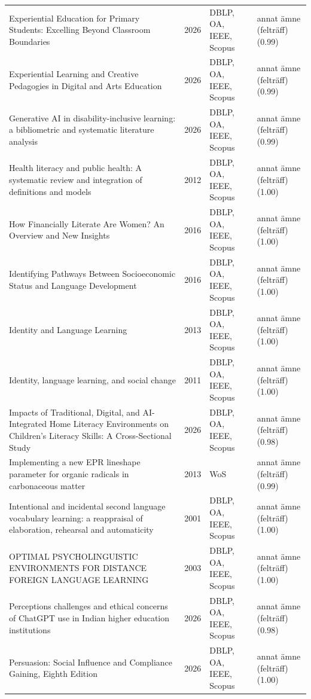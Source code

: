 \begin{longtable}{@{}%
  >{\raggedright\arraybackslash}p{}c%
  >{\raggedright\arraybackslash}p{}%
  >{\raggedright\arraybackslash}p{}@{}}
Experiential Education for Primary Students: Excelling Beyond Classroom Boundaries & 2026 & DBLP, OA, IEEE, Scopus & annat ämne (felträff) (0.99) \\
Experiential Learning and Creative Pedagogies in Digital and Arts Education & 2026 & DBLP, OA, IEEE, Scopus & annat ämne (felträff) (0.99) \\
Generative AI in disability-inclusive learning: a bibliometric and systematic literature analysis & 2026 & DBLP, OA, IEEE, Scopus & annat ämne (felträff) (0.99) \\
Health literacy and public health: A systematic review and integration of definitions and models & 2012 & DBLP, OA, IEEE, Scopus & annat ämne (felträff) (1.00) \\
How Financially Literate Are Women? An Overview and New Insights & 2016 & DBLP, OA, IEEE, Scopus & annat ämne (felträff) (1.00) \\
Identifying Pathways Between Socioeconomic Status and Language Development & 2016 & DBLP, OA, IEEE, Scopus & annat ämne (felträff) (1.00) \\
Identity and Language Learning & 2013 & DBLP, OA, IEEE, Scopus & annat ämne (felträff) (1.00) \\
Identity, language learning, and social change & 2011 & DBLP, OA, IEEE, Scopus & annat ämne (felträff) (1.00) \\
Impacts of Traditional, Digital, and AI-Integrated Home Literacy Environments on Children's Literacy Skills: A Cross-Sectional Study & 2026 & DBLP, OA, IEEE, Scopus & annat ämne (felträff) (0.98) \\
Implementing a new EPR lineshape parameter for organic radicals in carbonaceous matter & 2013 & WoS & annat ämne (felträff) (0.99) \\
Intentional and incidental second language vocabulary learning: a reappraisal of elaboration, rehearsal and automaticity & 2001 & DBLP, OA, IEEE, Scopus & annat ämne (felträff) (1.00) \\
OPTIMAL PSYCHOLINGUISTIC ENVIRONMENTS FOR DISTANCE FOREIGN LANGUAGE LEARNING & 2003 & DBLP, OA, IEEE, Scopus & annat ämne (felträff) (1.00) \\
Perceptions challenges and ethical concerns of ChatGPT use in Indian higher education institutions & 2026 & DBLP, OA, IEEE, Scopus & annat ämne (felträff) (0.98) \\
Persuasion: Social Influence and Compliance Gaining, Eighth Edition & 2026 & DBLP, OA, IEEE, Scopus & annat ämne (felträff) (1.00) \\

\end{longtable}
